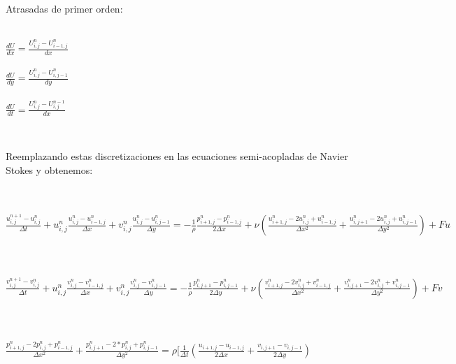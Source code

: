 \begin{minipage}{\linewidth}


Atrasadas de primer orden:
\begin{center}

~\\
$\frac{dU}{dx} = \frac{U^{n}_{i,j} - U^{n}_{i-1,j}}{dx} $
~\\
~\\
$\frac{dU}{dy} = \frac{U^{n}_{i,j} - U^{n}_{i,j-1}}{dy} $
~\\
~\\
$\frac{dU}{dt} = \frac{U^{n}_{i,j} - U^{n-1}_{i,j}}{dx} $
~\\
\end{center}
\end{minipage}
~\\

\begin{minipage}{\linewidth}

Reemplazando estas discretizaciones en las ecuaciones semi-acopladas de Navier Stokes y obtenemos: 
\begin{center}
~\\

~\\
$\frac{u_{i,j}^{n+1}-u_{i,j}^{n}}{\Delta t}+u_{i,j}^{n}\frac{u_{i,j}^{n}-u_{i-1,j}^{n}}{\Delta x}+v_{i,j}^{n}\frac{u_{i,j}^{n}-u_{i,j-1}^{n}}{\Delta y}
=-\frac{1}{\rho}\frac{p_{i+1,j}^{n}-p_{i-1,j}^{n}}{2\Delta x}+\nu (\frac{u_{i+1,j}^{n}-2u_{i,j}^{n}+u_{i-1,j}^{n}}{\Delta x^2}+\frac{u_{i,j+1}^{n}-2u_{i,j}^{n}+u_{i,j-1}^{n}}{\Delta y^2}) + Fu$
~\\
~\\
~\\

$\frac{v_{i,j}^{n+1}-v_{i,j}^{n}}{\Delta t}+u_{i,j}^{n}\frac{v_{i,j}^{n}-v_{i-1,j}^{n}}{\Delta x}+v_{i,j}^{n}\frac{v_{i,j}^{n}-v_{i,j-1}^{n}}{\Delta y}=-\frac{1}{\rho}\frac{p_{i,j+1}^{n}-p_{i,j-1}^{n}}{2\Delta y}
+\nu(\frac{v_{i+1,j}^{n}-2v_{i,j}^{n}+v_{i-1,j}^{n}}{\Delta x^2}+\frac{v_{i,j+1}^{n}-2v_{i,j}^{n}+v_{i,j-1}^{n}}{\Delta y^2}) + Fv$
~\\
~\\
~\\

$\frac{p_{i+1,j}^{n}-2p_{i,j}^{n}+p_{i-1,j}^{n}}{\Delta x^2}+\frac{p_{i,j+1}^{n}-2*p_{i,j}^{n}+p_{i,j-1}^{n}}{\Delta y^2} 
=\rho[\frac{1}{\Delta t}(\frac{u_{i+1,j}-u_{i-1,j}}{2\Delta x}+\frac{v_{i,j+1}-v_{i,j-1}}{2\Delta y})$
\end{center}

\end{minipage}
~\\
~\\

